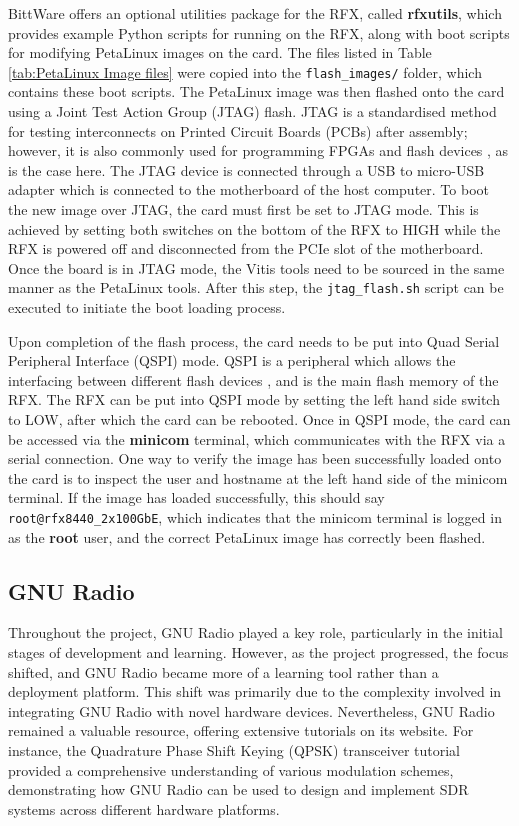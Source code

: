 \documentclass[12pt, a4paper]{article}
\begin{document}
BittWare offers an optional utilities package for the RFX, called \textbf{rfxutils}, which provides example Python scripts for running on the RFX, along with boot scripts for modifying PetaLinux images on the card. The files listed in Table \ref{tab:PetaLinux Image files} were copied into the \texttt{flash\_images/} folder, which contains these boot scripts. The PetaLinux image was then flashed onto the card using a Joint Test Action Group (JTAG) flash. JTAG is a standardised method for testing interconnects on Printed Circuit Boards (PCBs) after assembly; however, it is also commonly used for programming FPGAs and flash devices \cite{jtag}, as is the case here. The JTAG device is connected through a USB to micro-USB adapter which is connected to the motherboard of the host computer. To boot the new image over JTAG, the card must first be set to JTAG mode. This is achieved by setting both switches on the bottom of the RFX to HIGH while the RFX is powered off and disconnected from the PCIe slot of the motherboard. Once the board is in JTAG mode, the Vitis tools need to be sourced in the same manner as the PetaLinux tools. After this step, the \texttt{jtag\_flash.sh} script can be executed to initiate the boot loading process.

Upon completion of the flash process, the card needs to be put into Quad Serial Peripheral Interface (QSPI) mode. QSPI is a peripheral which allows the interfacing between different flash devices \cite{QSPI}, and is the main flash memory of the RFX. The RFX can be put into QSPI mode by setting the left hand side switch to LOW, after which the card can be rebooted. Once in QSPI mode, the card can be accessed via the \textbf{minicom} terminal, which communicates with the RFX via a serial connection. One way to verify the image has been successfully loaded onto the card is to inspect the user and hostname at the left hand side of the minicom terminal. If the image has loaded successfully, this should say \texttt{root@rfx8440\_2x100GbE}, which indicates that the minicom terminal is logged in as the \textbf{root} user, and the correct PetaLinux image has correctly been flashed.

\subsection{GNU Radio}

Throughout the project, GNU Radio played a key role, particularly in the initial stages of development and learning. However, as the project progressed, the focus shifted, and GNU Radio became more of a learning tool rather than a deployment platform. This shift was primarily due to the complexity involved in integrating GNU Radio with novel hardware devices. Nevertheless, GNU Radio remained a valuable resource, offering extensive tutorials on its website. For instance, the Quadrature Phase Shift Keying (QPSK) transceiver tutorial provided a comprehensive understanding of various modulation schemes, demonstrating how GNU Radio can be used to design and implement SDR systems across different hardware platforms.
\end{document}
